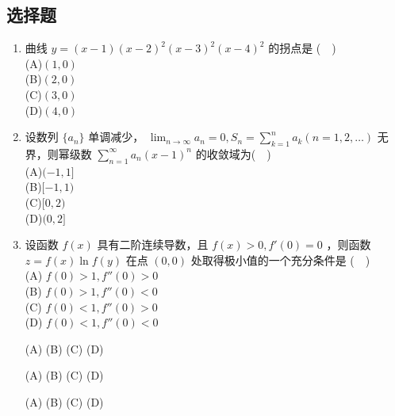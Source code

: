 \subsection{选择题}
\begin{enumerate}
\item 曲线 $y=(x-1)(x-2)^2(x-3)^2(x-4)^2$ 的拐点是  ($\quad$)\\
(A)$(1,0)$\\
(B)$(2,0)$\\
(C)$(3,0)$\\
(D)$(4,0)$
\item 设数列 $\{a_n\}$ 单调减少， $\displaystyle \lim_{n\to\infty} a_n=0,S_n=\sum_{k=1}^{n}a_k(n=1,2,\dots)$  无界，则幂级数 $\displaystyle \sum_{n=1}^\infty a_n(x-1)^n$ 的收敛域为($\quad$)\\
(A)$(-1,1]$\\
(B)$[-1,1)$\\
(C)$[0,2)$\\
(D)$(0,2]$
\item  设函数 $f(x)$ 具有二阶连续导数，且 $f(x)>0,f'(0)=0$  ，则函数  $z=f(x)\ln f(y)$ 在点 $(0,0)$ 处取得极小值的一个充分条件是 ($\quad$)\\
(A) $f(0)>1,f''(0)>0$\\
(B) $f(0)>1,f''(0)<0$\\
(C) $f(0)<1,f''(0)>0$\\
(D) $f(0)<1,f''(0)<0$


(A)
(B)
(C)
(D)

(A)
(B)
(C)
(D)


(A)
(B)
(C)
(D)
\end{enumerate}
